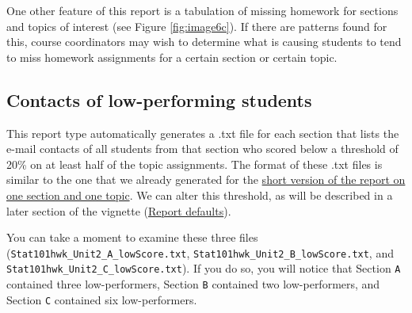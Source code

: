 \documentclass[11pt,a4paper,oldfontcommands,openany]{memoir}
\numberwithin{equation}{section} %
\begin{document}
One other feature of this report is a tabulation of missing homework for sections and topics of interest (see Figure \ref{fig:image6c}). If there are patterns found for this, course coordinators may wish to determine what is causing students to tend to miss homework assignments for a certain section or certain topic.

\begin{center}
\captionsetup{width=0.75\textwidth}
\label{fig:image6c}
\end{center}

\subsection{Contacts of low-performing students}
\label{sec:lowPer}

This report type automatically generates a .txt file for each section that lists the e-mail contacts of all students from that section who scored below a threshold of 20\% on at least half of the topic assignments. The format of these .txt files is similar to the one that we already generated for the \hyperref[sec:lowPerform]{short version of the report on one section and one topic}. We can alter this threshold, as will be described in a later section of the vignette (\hyperref[sec:repOptions]{Report defaults}).

You can take a moment to examine these three files (\texttt{Stat101hwk\_Unit2\_A\_lowScore.txt}, \texttt{Stat101hwk\_Unit2\_B\_lowScore.txt}, and \texttt{Stat101hwk\_Unit2\_C\_lowScore.txt}). If you do so, you will notice that Section \texttt{A} contained three low-performers, Section \texttt{B} contained two low-performers, and Section \texttt{C} contained six low-performers.
\end{document}
